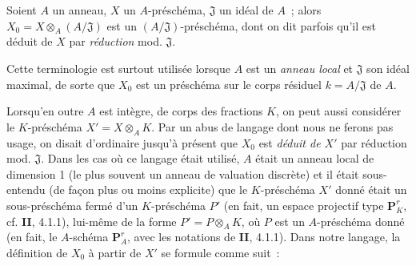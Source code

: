 \begin{env}[3.7.1]
\label{I.3.7.1-fr}
Soient $A$ un anneau, $X$ un $A$-préschéma, $\mathfrak{J}$ un idéal de $A$~;
alors $X_0=X\otimes_A(A/\mathfrak{J})$ est un
$(A/\mathfrak{J})$-préschéma, dont on dit parfois qu'il est déduit de $X$ par
\emph{réduction} mod. $\mathfrak{J}$.
\end{env}

\begin{env}[3.7.2]
\label{I.3.7.2-fr}
Cette terminologie est surtout utilisée lorsque $A$ est un \emph{anneau
local} et $\mathfrak{J}$ son idéal maximal, de sorte que $X_0$ est un
préschéma sur le corps résiduel $k=A/\mathfrak{J}$ de $A$.

Lorsqu'en outre $A$ est intègre, de corps des fractions $K$, on peut aussi
considérer le $K$-préschéma $X'=X\otimes_A K$. Par un abus de langage dont
nous ne ferons pas usage, on disait d'ordinaire jusqu'à présent que $X_0$ est
\emph{déduit de $X'$} par réduction mod. $\mathfrak{J}$. Dans les cas où ce
langage était utilisé, $A$ était un anneau local de dimension 1 (le plus
souvent un anneau de valuation discrète) et il était sous-entendu (de façon
plus ou moins explicite) que le $K$-préschéma $X'$ donné était un
sous-préschéma fermé d'un $K$-préschéma $P'$ (en fait, un espace projectif
type $\mathbf{P}_K^r$, cf. \textbf{II}, 4.1.1), lui-même de la forme
$P'=P\otimes_A K$, où $P$ est un $A$-préschéma donné (en fait, le $A$-schéma
$\mathbf{P}_A^r$, avec les notations de \textbf{II}, 4.1.1). Dans notre langage, la
définition de $X_0$ à partir de $X'$ se formule comme suit~:


\end{env}
